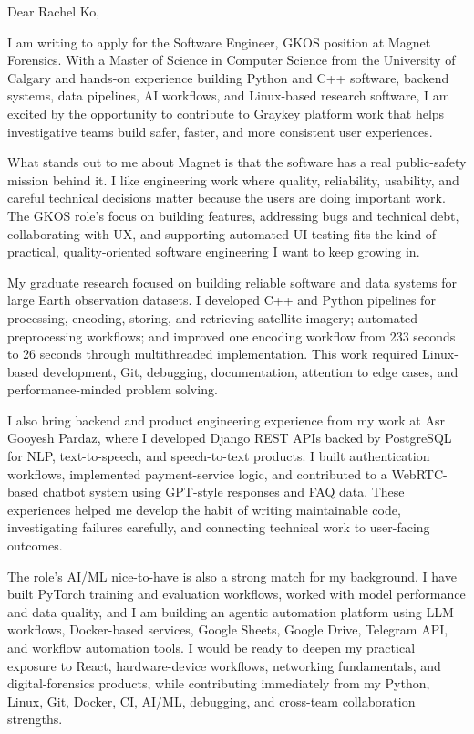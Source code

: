 \documentclass[11pt]{letter}
\begin{document}
\begin{letter}{}

\opening{Dear Rachel Ko,}

I am writing to apply for the Software Engineer, GKOS position at Magnet Forensics. With a Master of Science in Computer Science from the University of Calgary and hands-on experience building Python and C++ software, backend systems, data pipelines, AI workflows, and Linux-based research software, I am excited by the opportunity to contribute to Graykey platform work that helps investigative teams build safer, faster, and more consistent user experiences.

What stands out to me about Magnet is that the software has a real public-safety mission behind it. I like engineering work where quality, reliability, usability, and careful technical decisions matter because the users are doing important work. The GKOS role's focus on building features, addressing bugs and technical debt, collaborating with UX, and supporting automated UI testing fits the kind of practical, quality-oriented software engineering I want to keep growing in.

My graduate research focused on building reliable software and data systems for large Earth observation datasets. I developed C++ and Python pipelines for processing, encoding, storing, and retrieving satellite imagery; automated preprocessing workflows; and improved one encoding workflow from 233 seconds to 26 seconds through multithreaded implementation. This work required Linux-based development, Git, debugging, documentation, attention to edge cases, and performance-minded problem solving.

I also bring backend and product engineering experience from my work at Asr Gooyesh Pardaz, where I developed Django REST APIs backed by PostgreSQL for NLP, text-to-speech, and speech-to-text products. I built authentication workflows, implemented payment-service logic, and contributed to a WebRTC-based chatbot system using GPT-style responses and FAQ data. These experiences helped me develop the habit of writing maintainable code, investigating failures carefully, and connecting technical work to user-facing outcomes.

The role's AI/ML nice-to-have is also a strong match for my background. I have built PyTorch training and evaluation workflows, worked with model performance and data quality, and I am building an agentic automation platform using LLM workflows, Docker-based services, Google Sheets, Google Drive, Telegram API, and workflow automation tools. I would be ready to deepen my practical exposure to React, hardware-device workflows, networking fundamentals, and digital-forensics products, while contributing immediately from my Python, Linux, Git, Docker, CI, AI/ML, debugging, and cross-team collaboration strengths.


\end{letter}
\end{document}
